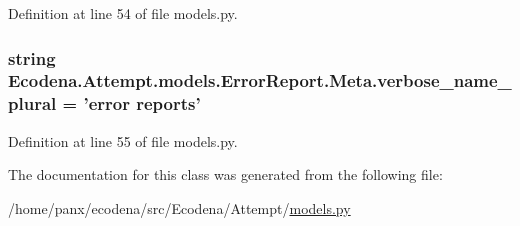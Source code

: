 Definition at line 54 of file models.py.

\hypertarget{class_ecodena_1_1_attempt_1_1models_1_1_error_report_1_1_meta_af5a03ae3d989401f2207e282fe47c680}{
\subsubsection[{verbose\_\-name\_\-plural}]{\setlength{\rightskip}{0pt plus 5cm}string {\bf Ecodena.Attempt.models.ErrorReport.Meta.verbose\_\-name\_\-plural} = 'error reports'}}
\label{d2/d9e/class_ecodena_1_1_attempt_1_1models_1_1_error_report_1_1_meta_af5a03ae3d989401f2207e282fe47c680}


Definition at line 55 of file models.py.



The documentation for this class was generated from the following file:\begin{DoxyCompactItemize}
\item 
/home/panx/ecodena/src/Ecodena/Attempt/\hyperlink{_attempt_2models_8py}{models.py}\end{DoxyCompactItemize}
